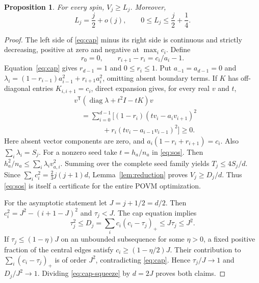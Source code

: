 \documentclass[aps,pra,reprint,superscriptaddress]{revtex4-2}
\newtheorem{proposition}[theorem]{Proposition}
\theoremstyle{remark}
\DeclareMathOperator{\diag}{diag}
\begin{document}
\begin{proposition}\label{prop:lower}
For every spin, $V_j\geq L_j$. Moreover,
\begin{equation}
 L_j=\frac j2+o(j),\qquad 0\leq L_j\leq\frac j2+\frac14.
 \label{eq:lower-asymptotic}
\end{equation}
\end{proposition}
\begin{proof}
The left side of \eqref{eq:cap} minus its right side is continuous
and strictly decreasing, positive at zero and negative at
$\max_i c_i$. Define
\[
 r_0=0,\qquad r_{i+1}-r_i=c_i/a_i-1.
\]
Equation~\eqref{eq:cap} gives $r_{d-1}=1$ and $0\leq r_i\leq1$.
Put $a_{-1}=a_{d-1}=0$ and
$\lambda_i=(1-r_{i-1})a_{i-1}^2+r_{i+1}a_i^2$, omitting absent
boundary terms. If $K$ has off-diagonal entries $K_{i,i+1}=c_i$,
direct expansion gives, for every real $v$ and $t$,
\begin{equation}
\begin{aligned}
&v^{\mathsf T}(\diag\lambda+t^2I-tK)v\\
&\quad=\sum_{i=0}^{d-1}\bigl[(1-r_i)(tv_i-a_iv_{i+1})^2\\
&\qquad\qquad{}+r_i(tv_i-a_{i-1}v_{i-1})^2\bigr]\geq0.
\end{aligned}
\label{eq:sos}
\end{equation}
Here absent vector components are zero, and
$a_i(1-r_i+r_{i+1})=c_i$. Also $\sum_i\lambda_i=S_j$.
For a nonzero seed take $t=h_a/n_a$ in \eqref{eq:sos}. Then
$h_a^2/n_a\leq\sum_i\lambda_i v_{a,i}^2$.
Summing over the complete seed family yields $T_j\leq4S_j/d$.
Since $\sum_i c_i^2=\frac23j(j+1)d$,
Lemma~\ref{lem:reduction} proves $V_j\geq D_j/d$.
Thus \eqref{eq:sos} is itself a certificate for the entire POVM
optimization.

For the asymptotic statement let $J=j+1/2=d/2$. Then
$c_i^2=J^2-(i+1-J)^2$ and $\tau_j<J$. The cap equation implies
\begin{equation}
 \tau_j^2\leq D_j=\sum_i c_i(c_i-\tau_j)_+
 \leq J\tau_j\leq J^2.
 \label{eq:cap-squeeze}
\end{equation}
If $\tau_j\leq(1-\eta)J$ on an unbounded subsequence for some
$\eta>0$, a fixed positive fraction of the central edges satisfy
$c_i\geq(1-\eta/2)J$. Their contribution to
$\sum_i(c_i-\tau_j)_+$ is of order $J^2$, contradicting
\eqref{eq:cap}. Hence $\tau_j/J\to1$ and $D_j/J^2\to1$.
Dividing \eqref{eq:cap-squeeze} by $d=2J$ proves both claims.
\end{proof}
\end{document}
